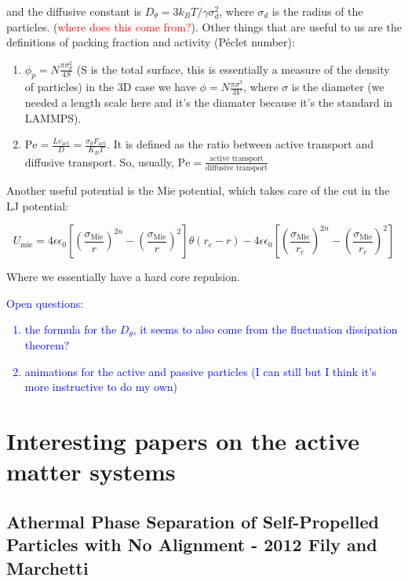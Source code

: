 \documentclass[a4paper]{article}
\begin{document}
and the diffusive constant is $D_\theta= 3k_B T/\gamma \sigma_d^2$, where $\sigma_d$ is the radius of the particles. (\textcolor{red}{where does this come from?}). Other things that are useful to us are the definitions of packing fraction and activity (Péclet number):

\begin{enumerate}
	\item $\phi_p = N\frac{\pi \sigma_d^2}{4S}$ (S is the total surface, this is essentially a measure of the density of particles) in the 3D case we have $\phi=N\frac{\pi \sigma^3}{3V}$, where $\sigma$ is the diameter (we needed a length scale here and it's the diamater because it's the standard in LAMMPS).
	\item $\text{Pe}=\frac{L v_\text{act}}{D}=\frac{\sigma_d F_\text{act}}{K_B T}$. It is defined as the ratio between active transport and diffusive transport. So, usually,
	$
	\text{Pe} = \frac{\text{active transport}}{\text{diffusive transport}}
	$
\end{enumerate}

Another useful potential is the Mie potential, which takes care of the cut in the LJ potential:

\begin{equation}
	U_\text{mie}=4\epsilon\epsilon_0\left[\left(\frac{\sigma_\text{Mie}}{r}\right)^{2n}-\left(\frac{\sigma_\text{Mie}}{r}\right)^{2}\right]\theta(r_c-r)-4\epsilon\epsilon_0\left[\left(\frac{\sigma_\text{Mie}}{r_c}\right)^{2n}-\left(\frac{\sigma_\text{Mie}}{r_c}\right)^{2}\right]
\end{equation}

Where we essentially have a hard core repulsion.

\textcolor{blue}{Open questions:
\begin{enumerate}
	\item the formula for the $D_\theta$, it seems to also come from the fluctuation dissipation theorem?
	\item animations for the active and passive particles (I can still but I think it's more instructive to do my own)
\end{enumerate}}

\section{Interesting papers on the active matter systems}

\subsection{Athermal Phase Separation of Self-Propelled Particles with No Alignment - 2012 Fily and Marchetti}
\end{document}
